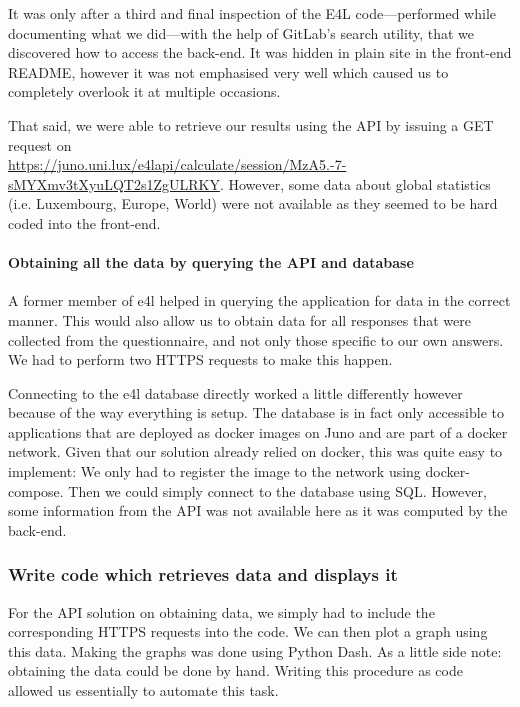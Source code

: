 It was only after a third and final inspection of the E4L
code---performed while documenting what we did---with the help of
GitLab's search utility, that we discovered how to access the
back-end.  It was hidden in plain site in the front-end README,
however it was not emphasised very well which caused us to completely
overlook it at multiple occasions.

That said, we were able to retrieve our results using the API by
issuing a GET request on
\\\url{https://juno.uni.lux/e4lapi/calculate/session/MzA5.-7-sMYXmv3tXyuLQT2s1ZgULRKY}.
However, some data about global statistics (i.e. Luxembourg, Europe,
World) were not available as they seemed to be hard coded into the
front-end.

\paragraph{Obtaining all the data by querying the API and database}

A former member of \gls{e4l} helped in querying the application for
data in the correct manner. This would also allow us to obtain data
for all responses that were collected from the questionnaire, and not
only those specific to our own answers. We had to perform two HTTPS
requests to make this happen.

Connecting to the \gls{e4l} database directly worked a little
differently however because of the way everything is setup. The
database is in fact only accessible to applications that are deployed
as docker images on Juno and are part of a docker network. Given that
our solution already relied on docker, this was quite easy to
implement: We only had to register the image to the network using
docker-compose. Then we could simply connect to the database using
SQL. However, some information from the API was not available here as it was
computed by the back-end.

\subsubsection{Write code which retrieves data and displays it}

For the API solution on obtaining data, we simply had to include the
corresponding HTTPS requests into the code. We can then plot a graph
using this data. Making the graphs was done using Python Dash. As a
little side note: obtaining the data could be done by hand.
Writing this procedure as code allowed us essentially to automate this
task.

